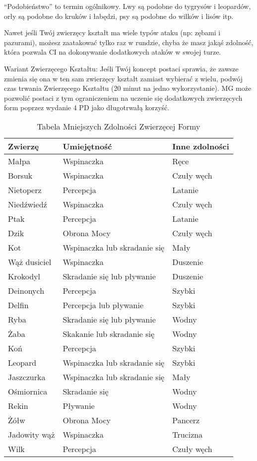 ``Podobieństwo'' to termin ogólnikowy. Lwy są podobne do tygrysów i leopardów, orły są podobne do kruków i łabędzi, psy są podobne do wilków i lisów itp.

Nawet jeśli Twój zwierzęcy kształt ma wiele typów ataku (np: zębami i pazurami), możesz zaatakować tylko raz w rundzie, chyba że masz jakąś zdolność, która pozwala CI na dokonywanie dodatkowych ataków w swojej turze.

Wariant Zwierzęcego Kształtu: Jeśli Twój koncept postaci sprawia, że zawsze zmienia się ona w ten sam zwierzęcy kształt zamiast wybierać z wielu, podwój czas trwania Zwierzęcego Kształtu (20 minut na jedno wykorzystanie). MG może pozwolić postaci z tym ograniczeniem na uczenie się dodatkowych zwierzęcych form poprzez wydanie 4 PD jako długotrwałą korzyść. 

\begin{table*}[t]

\centering
\caption{Tabela Mniejszych Zdolności Zwierzęcej Formy}
\label{Tabela Mniejszych Zdolności Zwierzęcej Formy}

\begin{tabularx}{\textwidth}{| X | X | X |}
\hline
 
 \textbf{Zwierzę} & \textbf{Umiejętność} & \textbf{Inne zdolności} \\ \hline

 Małpa & Wspinaczka & Ręce \\ \hline
 Borsuk & Wspinaczka & Czuły węch \\ \hline
 Nietoperz & Percepcja & Latanie \\ \hline
 Niedźwiedź & Wspinaczka & Czuły węch \\ \hline
 Ptak & Percepcja & Latanie \\ \hline
 Dzik & Obrona Mocy & Czuły węch \\ \hline
 Kot & Wspinaczka lub skradanie się & Mały \\  \hline
 Wąż dusiciel & Wspinaczka & Duszenie \\  \hline
 Krokodyl & Skradanie się lub pływanie & Duszenie \\  \hline
 Deinonych & Percepcja & Szybki \\  \hline
 Delfin & Percepcja lub pływanie & Szybki \\  \hline
 Ryba & Skradanie się lub pływanie & Wodny \\ \hline
 Żaba & Skakanie lub skradanie się & Wodny \\ \hline
 Koń & Percepcja & Szybki \\ \hline
 Leopard & Wspinaczka lub skradanie się & Szybki \\ \hline
 Jaszczurka & Wspinaczka lub skradanie się & Mały \\ \hline
 Ośmiornica & Skradanie się & Wodny \\ \hline
 Rekin & Pływanie & Wodny \\ \hline
 Żółw & Obrona Mocy & Pancerz \\ \hline
 Jadowity wąż & Wspinaczka & Trucizna \\ \hline
 Wilk & Percepcja & Czuły węch \\ \hline
 

\end{tabularx}
\end{table*}
